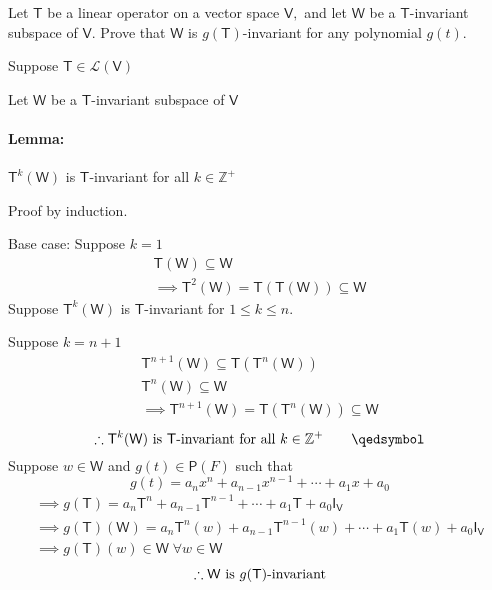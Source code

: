 Let $\mathsf{T}$ be a linear operator on a vector space $\mathsf{V},$
and let $\mathsf{W}$ be a $\mathsf{T}$-invariant subspace of
$\mathsf{V}.$ Prove that $\mathsf{W}$ is $g(\mathsf{T})$-invariant for
any polynomial $g(t).$

Suppose $\mathsf{T} \in \mathcal{L}(\mathsf{V})$ 

Let $\mathsf{W}$ be a $\mathsf{T}$-invariant subspace of $\mathsf{V}$

\paragraph{Lemma:} $\mathsf{T}^k(\mathsf{W})$ is
$\mathsf{T}$-invariant for all $k \in \mathbb{Z}^+$

Proof by induction.

Base case: Suppose $k=1$
\begin{gather}
\mathsf{T}(\mathsf{W}) \subseteq \mathsf{W}\\
\implies \mathsf{T}^2(\mathsf{W}) = \mathsf{T}(\mathsf{T}(\mathsf{W}))
\subseteq \mathsf{W}
\end{gather}
Suppose $\mathsf{T}^k(\mathsf{W})$ is $\mathsf{T}$-invariant for $1
\leq k \leq n.$

Suppose $k=n+1$
\begin{gather}
\mathsf{T}^{n+1}(\mathsf{W}) \subseteq
\mathsf{T}(\mathsf{T}^n(\mathsf{W}))\\
\mathsf{T}^n(\mathsf{W}) \subseteq \mathsf{W}\\
\implies \mathsf{T}^{n+1}(\mathsf{W}) =
\mathsf{T}(\mathsf{T}^n(\mathsf{W})) \subseteq \mathsf{W}
\end{gather}
\begin{equation}
\notag \therefore \mathsf{T}^k(\mathsf{W}) \text{ is }
\mathsf{T}\text{-invariant for all } k \in \mathbb{Z}^+ \qquad \qedsymbol
\end{equation}
Suppose $w \in \mathsf{W}$ and $g(t) \in \mathsf{P}(F)$ such that 
\begin{equation}
g(t) = a_nx^n +a_{n-1}x^{n-1} + \dotsb + a_1x + a_0 
\end{equation}
\begin{gather}
\implies g(\mathsf{T}) = a_n\mathsf{T}^n + a_{n-1}\mathsf{T}^{n-1} +
\dotsb + a_1\mathsf{T} +a_0\mathsf{I}_\mathsf{V}\\
\implies g(\mathsf{T})(\mathsf{W}) = a_n\mathsf{T}^n(w) +
a_{n-1}\mathsf{T}^{n-1}(w) +\dotsb + a_1\mathsf{T}(w) +
a_0\mathsf{I}_\mathsf{V}\\
\implies g(\mathsf{T})(w) \in \mathsf{W}\; \forall w \in \mathsf{W}
\end{gather}
\begin{equation}
\notag \therefore \mathsf{W} \text{ is } g(\mathsf{T})\text{-invariant}
\end{equation}
